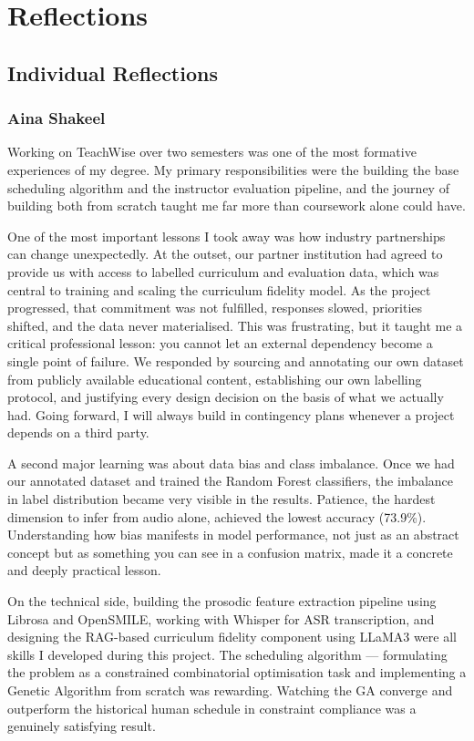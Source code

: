 \section{Reflections}
\label{sec:reflections}

\subsection{Individual Reflections}

\subsubsection{Aina Shakeel}

Working on TeachWise over two semesters was one of the most formative experiences of my degree. My primary responsibilities were the building the base scheduling algorithm and the instructor evaluation pipeline, and the journey of building both from scratch taught me far more than coursework alone could have.

One of the most important lessons I took away was how industry partnerships can change unexpectedly. At the outset, our partner institution had agreed to provide us with access to labelled curriculum and evaluation data, which was central to training and scaling the curriculum fidelity model. As the project progressed, that commitment was not fulfilled, responses slowed, priorities shifted, and the data never materialised. This was frustrating, but it taught me a critical professional lesson: you cannot let an external dependency become a single point of failure. We responded by sourcing and annotating our own dataset from publicly available educational content, establishing our own labelling protocol, and justifying every design decision on the basis of what we actually had. Going forward, I will always build in contingency plans whenever a project depends on a third party.

A second major learning was about data bias and class imbalance. Once we had our annotated dataset and trained the Random Forest classifiers, the imbalance in label distribution became very visible in the results. Patience, the hardest dimension to infer from audio alone, achieved the lowest accuracy (73.9\%). Understanding how bias manifests in model performance, not just as an abstract concept but as something you can see in a confusion matrix, made it a concrete and deeply practical lesson.

On the technical side, building the prosodic feature extraction pipeline using Librosa and OpenSMILE, working with Whisper for ASR transcription, and designing the RAG-based curriculum fidelity component using LLaMA3 were all skills I developed during this project. The scheduling algorithm --- formulating the problem as a constrained combinatorial optimisation task and implementing a Genetic Algorithm from scratch was rewarding. Watching the GA converge and outperform the historical human schedule in constraint compliance was a genuinely satisfying result.

